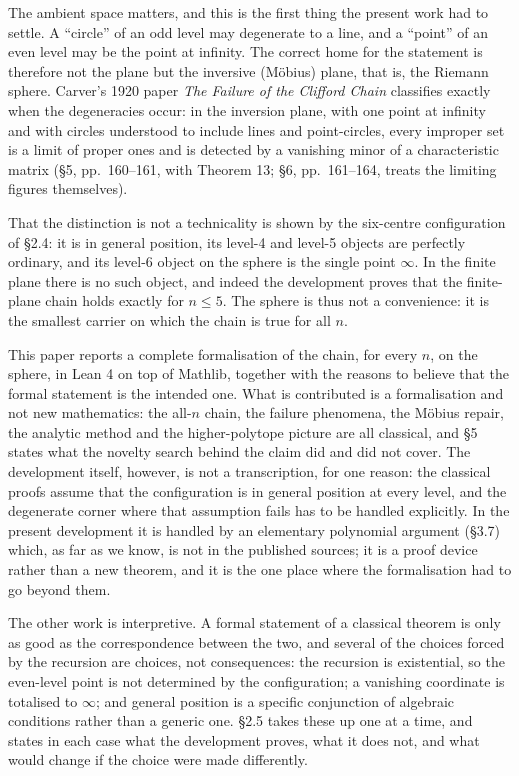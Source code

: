 \documentclass[11pt]{article}
\theoremstyle{definition}
\theoremstyle{remark}
\begin{document}
The ambient space matters, and this is the first thing the present work had to settle. A ``circle'' of an
odd level may degenerate to a line, and a ``point'' of an even level may be the point at infinity. The
correct home for the statement is therefore not the plane but the inversive (M\"obius) plane, that is, the
Riemann sphere. Carver's 1920 paper \emph{The Failure of the Clifford Chain} classifies exactly when the
degeneracies occur: in the inversion plane, with one point at infinity and with circles understood to
include lines and point-circles, every improper set is a limit of proper ones and is detected by a
vanishing minor of a characteristic matrix (\S{}5, pp.~160--161, with Theorem 13; \S{}6, pp.~161--164, treats the
limiting figures themselves).

That the distinction is not a technicality is shown by the six-centre configuration of \S{}2.4: it is in
general position, its level-4 and level-5 objects are perfectly ordinary, and its level-6 object on the
sphere is the single point $\infty$. In the finite plane there is no such object, and indeed the development
proves that the finite-plane chain holds exactly for \(n \le 5\). The sphere is thus not a convenience: it
is the smallest carrier on which the chain is true for all \(n\).

This paper reports a complete formalisation of the chain, for every \(n\), on the sphere, in Lean 4 on top
of Mathlib, together with the reasons to believe that the formal statement is the intended one. What is
contributed is a formalisation and not new mathematics: the all-\(n\) chain, the failure phenomena, the
M\"obius repair, the analytic method and the higher-polytope picture are all classical, and \S{}5 states what
the novelty search behind the claim did and did not cover. The development itself, however, is not a
transcription, for one reason: the classical proofs assume that the configuration is in general position
at every level, and the degenerate corner where that assumption fails has to be handled explicitly. In
the present development it is handled by an elementary polynomial argument (\S{}3.7) which, as far as we
know, is not in the published sources; it is a proof device rather than a new theorem, and it is the one
place where the formalisation had to go beyond them.

The other work is interpretive. A formal statement of a classical theorem is only as good as the
correspondence between the two, and several of the choices forced by the recursion are choices, not
consequences: the recursion is existential, so the even-level point is not determined by the
configuration; a vanishing coordinate is totalised to $\infty$; and general position is a specific conjunction
of algebraic conditions rather than a generic one. \S{}2.5 takes these up one at a time, and states in each
case what the development proves, what it does not, and what would change if the choice were made
differently.
\end{document}
